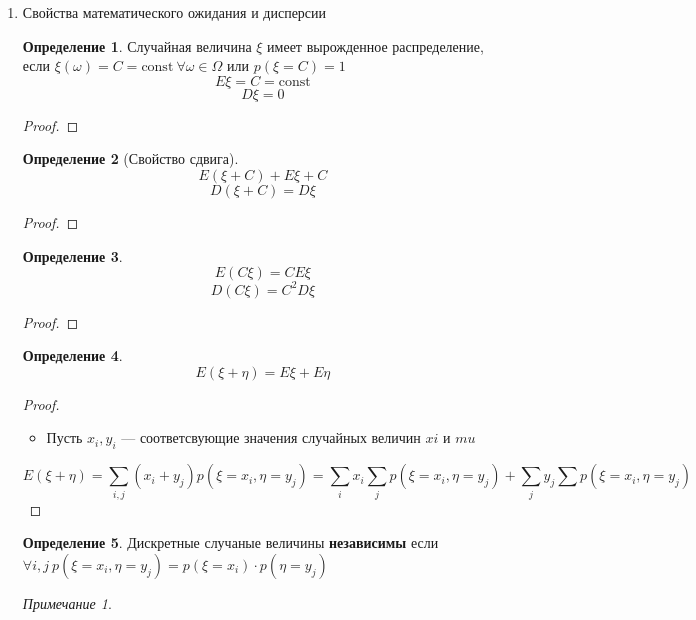 \documentclass[english]{article}
\newcommand{\const}{\text{const}}
\theoremstyle{plain}
\theoremstyle{remark}
\newtheorem*{remark}{Примечание}
\newtheorem*{examp}{Пример}
\theoremstyle{definition}
\newtheorem*{definition}{Определение}
\begin{document}
\begin{enumerate}
\begin{enumerate}
\begin{examp}
\hyperref[org3db6661]{Бросаем кость}
\[ E\xi = 1\cdot \frac{1}{6} + 2 \cdot \frac{1}{6}  + 3 \cdot \frac{1}{6} + 4 \cdot \frac{1}{6} + 5 \cdot \frac{1}{6} + 6 \cdot \frac{1}{6} = 3.5 \]
\[ D\xi = 1^2 \cdot \frac{1}{6} + 2^2 \cdot \frac{1}{6} + 3^2 \cdot \frac{1}{6} + 4^2 \cdot \frac{1}{6} + 5^2 \cdot \frac{1}{6} + 6^2 \cdot \frac{1}{6} - 3.5^2 = 2.92 \]
\[ \sigma = \sqrt{2.92} \approx 1 \neq 1 \]
\end{examp}
\end{enumerate}
\item Свойства математического ожидания и дисперсии
\label{sec:org070404f}
\begin{definition}
Случайная величина \(\xi\) имеет вырожденное распределение, если \(\xi(\omega) = C = \const\ \forall \omega \in \Omega\) или \(p(\xi = C) = 1\)
\[ E \xi = C = \const \]
\[ D \xi = 0 \]
\end{definition}
\begin{proof}
\todo
\end{proof}
\begin{definition}[Свойство сдвига]
\[E(\xi + C) + E\xi + C\]
\[ D(\xi + C) = D \xi \]
\end{definition}
\begin{proof}
\todo
\end{proof}
\begin{definition}
\[ E(C\xi) = CE\xi \]
\[ D(C\xi) = C^2D\xi \]
\end{definition}
\begin{proof}
\todo
\end{proof}
\begin{definition}
\[ E(\xi + \eta) = E\xi + E\eta \]
\end{definition}
\begin{proof}
\-
\begin{itemize}
\item Пусть \(x_i, y_i\) --- соответсвующие значения случайных величин \(xi\) и \(mu\)
\end{itemize}
\[ E(\xi + \eta) = \sum\limits_{i, j} (x_i + y_j) p(\xi = x_i, \eta = y_j) = \sum\limits_i x_i \sum\limits_j p(\xi = x_i, \eta = y_j) + \sum\limits_j y_j \sum p(\xi = x_i, \eta = y_j) \]
\todo
\end{proof}
\begin{definition}
Дискретные случаные величины \textbf{независимы} если \(\forall i, j\ p(\xi = x_i, \eta = y_j) = p(\xi = x_i) \cdot p(\eta = y_j)\)
\label{orgd327a3e}
\end{definition}
\begin{remark}

\end{remark}
\end{enumerate}
\end{document}
